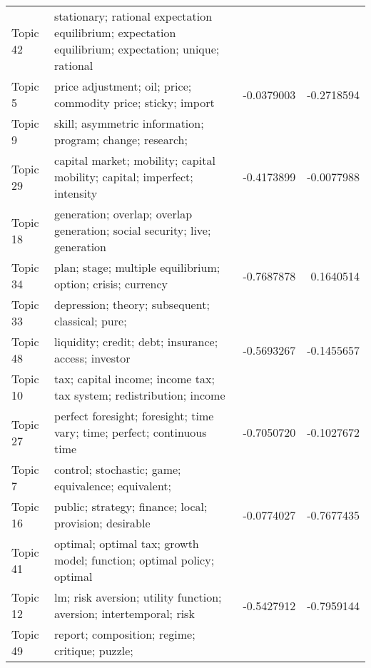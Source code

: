 \documentclass[
  12pt,
  onecolumn]{article}
\begin{document}
\begin{longtable}[t]{llrr}
\addlinespace
Topic 42 & stationary;
rational
expectation
equilibrium;
expectation
equilibrium;
expectation;
unique;
rational
\cellcolor{gray!6}{expectation} & \cellcolor{gray!6}{0.0421424} & \cellcolor{gray!6}{-0.3385508}\\
Topic 5 & price
adjustment;
oil;
price;
commodity
price;
sticky;
import & -0.0379003 & -0.2718594\\
Topic 9 & skill;
asymmetric
information;
program;
change;
research;
\cellcolor{gray!6}{complementarity} & \cellcolor{gray!6}{-0.0119248} & \cellcolor{gray!6}{-0.3214564}\\
Topic 29 & capital
market;
mobility;
capital
mobility;
capital;
imperfect;
intensity & -0.4173899 & -0.0077988\\
Topic 18 & generation;
overlap;
overlap
generation;
social
security;
live;
generation
\cellcolor{gray!6}{model} & \cellcolor{gray!6}{-0.2943298} & \cellcolor{gray!6}{-0.3082112}\\
\addlinespace
Topic 34 & plan;
stage;
multiple
equilibrium;
option;
crisis;
currency & -0.7687878 & 0.1640514\\
Topic 33 & depression;
theory;
subsequent;
classical;
pure;
\cellcolor{gray!6}{principle} & \cellcolor{gray!6}{0.0237933} & \cellcolor{gray!6}{-0.6877008}\\
Topic 48 & liquidity;
credit;
debt;
insurance;
access;
investor & -0.5693267 & -0.1455657\\
Topic 10 & tax;
capital
income;
income
tax;
tax
system;
redistribution;
income
\cellcolor{gray!6}{taxation} & \cellcolor{gray!6}{-0.1531663} & \cellcolor{gray!6}{-0.6459524}\\
Topic 27 & perfect
foresight;
foresight;
time
vary;
time;
perfect;
continuous
time & -0.7050720 & -0.1027672\\
\addlinespace
Topic 7 & control;
stochastic;
game;
equivalence;
equivalent;
\cellcolor{gray!6}{solution} & \cellcolor{gray!6}{-0.2029800} & \cellcolor{gray!6}{-0.6091385}\\
Topic 16 & public;
strategy;
finance;
local;
provision;
desirable & -0.0774027 & -0.7677435\\
Topic 41 & optimal;
optimal
tax;
growth
model;
function;
optimal
policy;
optimal
\cellcolor{gray!6}{taxation} & \cellcolor{gray!6}{0.0421424} & \cellcolor{gray!6}{-1.0667893}\\
Topic 12 & lm;
risk
aversion;
utility
function;
aversion;
intertemporal;
risk & -0.5427912 & -0.7959144\\
Topic 49 & report;
composition;
regime;
critique;
puzzle;

\end{longtable}
\end{document}
